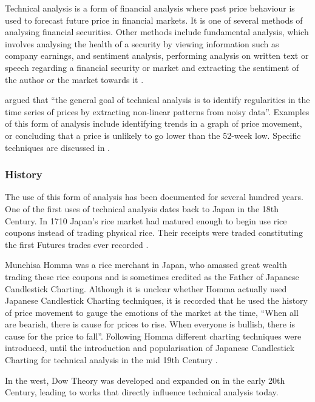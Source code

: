 \documentclass{article}
\theoremstyle{definition}
\begin{document}
Technical analysis is a form of financial analysis where past price behaviour is used to forecast future price in financial markets. It is one of several methods of analysing financial securities. Other methods include fundamental analysis, which involves analysing the health of a security by viewing information such as company earnings, and sentiment analysis, performing analysis on written text or speech regarding a financial security or market and extracting the sentiment of the author or the market towards it \citep[p. 2]{ahmad2011affective}.

\cite{foundations} argued that ``the general goal of technical analysis is to identify regularities in the time series of prices by extracting non-linear patterns from noisy data''. Examples of this form of analysis include identifying trends in a graph of price movement, or concluding that a price is unlikely to go lower than the 52-week low. Specific techniques are discussed in .

\subsubsection{History}
\label{tahist}
The use of this form of analysis has been documented for several hundred years. One of the first uses of technical analysis dates back to Japan in the 18th Century. In 1710 Japan's rice market had matured enough to begin use rice coupons instead of trading physical rice. Their receipts were traded constituting the first Futures trades ever recorded \citep[p.15]{jcct1991}. 

Munehisa Homma was a rice merchant in Japan, who amassed great wealth trading these rice coupons and is sometimes credited as the Father of Japanese Candlestick Charting. Although it is unclear whether Homma actually used Japanese Candlestick Charting techniques, it is recorded that he used the history of price movement to gauge the emotions of the market at the time, ``When all are bearish, there is cause for prices to rise. When everyone is bullish, there is cause for the price to fall''. Following Homma different charting techniques were introduced, until the introduction and popularisation of Japanese Candlestick Charting for technical analysis in the mid 19th Century \citep[p.18]{jcct1994}.

In the west, Dow Theory was developed and expanded on in the early 20th Century, leading to works \citep{edwards2012technical} that directly influence technical analysis today.
\end{document}
